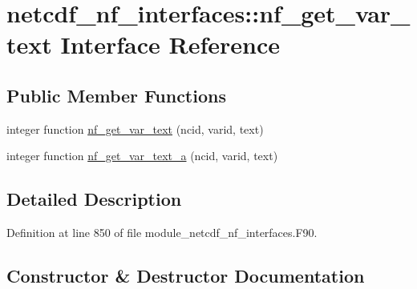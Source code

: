 \hypertarget{interfacenetcdf__nf__interfaces_1_1nf__get__var__text}{}\section{netcdf\+\_\+nf\+\_\+interfaces\+:\+:nf\+\_\+get\+\_\+var\+\_\+text Interface Reference}
\label{interfacenetcdf__nf__interfaces_1_1nf__get__var__text}
\subsection*{Public Member Functions}
\begin{DoxyCompactItemize}
\item 
integer function \hyperlink{interfacenetcdf__nf__interfaces_1_1nf__get__var__text_ae6bf1da2cb50190e37e4b01335f407c7}{nf\+\_\+get\+\_\+var\+\_\+text} (ncid, varid, text)
\item 
integer function \hyperlink{interfacenetcdf__nf__interfaces_1_1nf__get__var__text_ad9ea4a241f2463b554365a0d74b1a056}{nf\+\_\+get\+\_\+var\+\_\+text\+\_\+a} (ncid, varid, text)
\end{DoxyCompactItemize}


\subsection{Detailed Description}


Definition at line 850 of file module\+\_\+netcdf\+\_\+nf\+\_\+interfaces.\+F90.



\subsection{Constructor \& Destructor Documentation}
\mbox{\label{interfacenetcdf__nf__interfaces_1_1nf__get__var__text_ae6bf1da2cb50190e37e4b01335f407c7}} 
